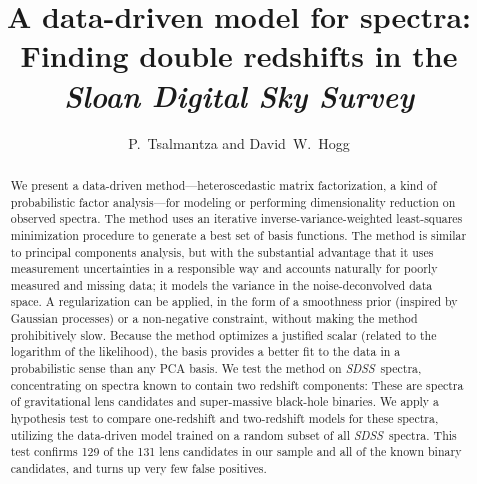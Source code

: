 \documentclass[12pt,preprint]{aastex}
\newcommand{\project}[1]{\textsl{#1}}
\newcommand{\sdss}{\project{SDSS}}
\newcommand{\SDSS}{\sdss}
\begin{document}
\sloppy

\title{A data-driven model for spectra:\\
       Finding double redshifts in the \project{Sloan Digital Sky Survey}}
\author{P.~Tsalmantza and David~W.~Hogg}

\begin{abstract}
We present a data-driven method---heteroscedastic matrix
factorization, a kind of probabilistic factor analysis---for modeling
or performing dimensionality reduction on observed spectra.  The
method uses an iterative inverse-variance-weighted least-squares
minimization procedure to generate a best set of basis functions.  The
method is similar to principal components analysis, but with the
substantial advantage that it uses measurement uncertainties in a
responsible way and accounts naturally for poorly measured and missing
data; it models the variance in the noise-deconvolved data space.  A
regularization can be applied, in the form of a smoothness prior
(inspired by Gaussian processes) or a non-negative constraint, without
making the method prohibitively slow.  Because the method optimizes a
justified scalar (related to the logarithm of the likelihood), the
basis provides a better fit to the data in a probabilistic sense than
any PCA basis.  We test the method on \SDSS\ spectra, concentrating on
spectra known to contain two redshift components: These are spectra of
gravitational lens candidates and super-massive black-hole
binaries. We apply a hypothesis test to compare one-redshift and
two-redshift models for these spectra, utilizing the data-driven model
trained on a random subset of all \SDSS\ spectra.  This test confirms
129 of the 131 lens candidates in our sample and all of the known
binary candidates, and turns up very few false positives.
\end{abstract}

\end{document}
